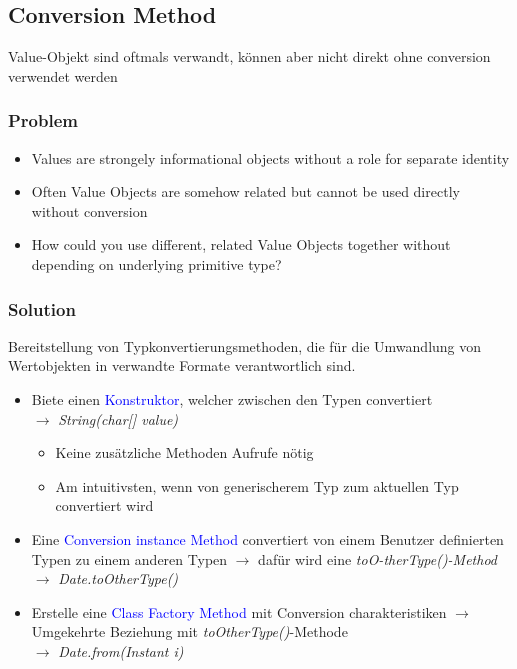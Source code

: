 \subsection{Conversion Method}

Value-Objekt sind oftmals verwandt, können aber nicht direkt ohne conversion verwendet werden

\subsubsection{Problem}
\begin{itemize}
    \item Values are strongely informational objects without a role for separate identity
    \item Often Value Objects are somehow related but cannot be used directly without conversion
    \item How could you use different, related Value Objects together without depending on underlying primitive type?
\end{itemize}

\subsubsection{Solution}
Bereitstellung von Typkonvertierungsmethoden, die für die Umwandlung von Wertobjekten in verwandte Formate verantwortlich sind.

\begin{itemize}
    \item Biete einen \textcolor{blue}{Konstruktor}, welcher zwischen den Typen convertiert \\
    $\rightarrow$ \textit{String(char[] value)}
    \begin{itemize}
        \item Keine zusätzliche Methoden Aufrufe nötig
        \item Am intuitivsten, wenn von generischerem Typ zum aktuellen Typ convertiert wird
    \end{itemize}
    \item Eine \textcolor{blue}{Conversion instance Method} convertiert von einem Benutzer definierten Typen zu einem anderen Typen $\rightarrow$ dafür wird eine \textit{toO-therType()-Method} \\
    $\rightarrow$ \textit{Date.toOtherType()}
    \item Erstelle eine \textcolor{blue}{Class Factory Method} mit Conversion charakteristiken $\rightarrow$ Umgekehrte Beziehung mit \textit{toOtherType()}-Methode \\
    $\rightarrow$ \textit{Date.from(Instant i)}
\end{itemize}

